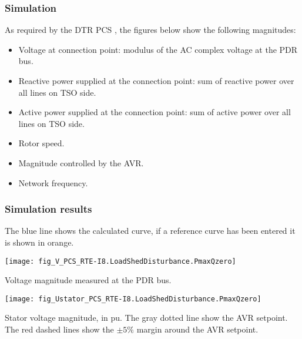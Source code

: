     \subsubsection{Simulation}
    As required by the DTR PCS \DTRPcs, the figures below show the
    following magnitudes:
    \begin{itemize}
        \item Voltage at connection point: modulus of the AC complex voltage at
        the PDR bus.
        \item Reactive power supplied at the connection point: sum of reactive power
        over all lines on TSO side.
        \item Active power supplied at the connection point: sum of active power
        over all lines on TSO side.
        \item Rotor speed.
        \item Magnitude controlled by the AVR.
        \item Network frequency.
    \end{itemize}

    \subsubsection{Simulation results}
    The blue line shows the calculated curve, if a reference curve has been entered it is
    shown in orange.

    \noindent
    \begin{minipage}[t]{0.48\textwidth}
        \centering
        \texttt{[image: fig\_V\_PCS\_RTE-I8.LoadShedDisturbance.PmaxQzero]}
        \begin{minipage}[t]{0.8\textwidth}
            \small Voltage magnitude measured at the PDR bus.
        \end{minipage}
    \end{minipage}
    \hfill
    \begin{minipage}[t]{0.48\textwidth}
        \centering
        \texttt{[image: fig\_Ustator\_PCS\_RTE-I8.LoadShedDisturbance.PmaxQzero]}
        \begin{minipage}[t]{0.8\textwidth}
            \small Stator voltage magnitude, in pu. The gray dotted line show
            the AVR setpoint. The red dashed lines show the $\pm 5\%$ margin
            around the AVR setpoint.
        \end{minipage}
    \end{minipage}

